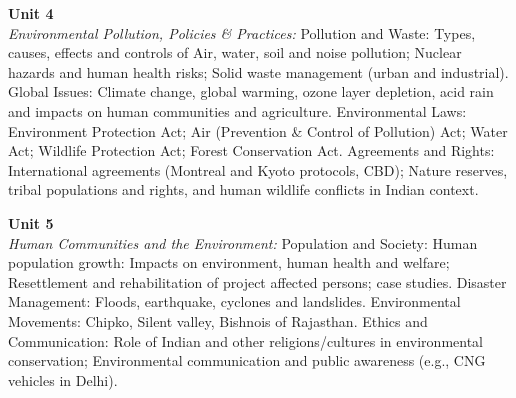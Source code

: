 \vspace{0.3cm}

\noindent\textbf{Unit 4} \\
\textit{Environmental Pollution, Policies \& Practices:} Pollution and Waste: Types, causes, effects and controls of Air, water, soil and noise pollution; Nuclear hazards and human health risks; Solid waste management (urban and industrial). Global Issues: Climate change, global warming, ozone layer depletion, acid rain and impacts on human communities and agriculture. Environmental Laws: Environment Protection Act; Air (Prevention \& Control of Pollution) Act; Water Act; Wildlife Protection Act; Forest Conservation Act. Agreements and Rights: International agreements (Montreal and Kyoto protocols, CBD); Nature reserves, tribal populations and rights, and human wildlife conflicts in Indian context.

\vspace{0.3cm}

\noindent\textbf{Unit 5} \\
\textit{Human Communities and the Environment:} Population and Society: Human population growth: Impacts on environment, human health and welfare; Resettlement and rehabilitation of project affected persons; case studies. Disaster Management: Floods, earthquake, cyclones and landslides. Environmental Movements: Chipko, Silent valley, Bishnois of Rajasthan. Ethics and Communication: Role of Indian and other religions/cultures in environmental conservation; Environmental communication and public awareness (e.g., CNG vehicles in Delhi).

\newpage
{}